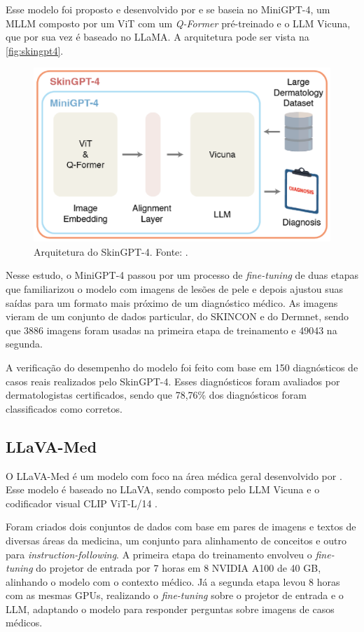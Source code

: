 Esse modelo foi proposto e desenvolvido por \textcite{zhou2023skingpt} e se baseia no Mini\ac{GPT}-4, um \ac{MLLM} composto por um \ac{ViT} com um \textit{Q-Former}
pré-treinado e o \ac{LLM} Vicuna, que por sua vez é baseado no \ac{LLaMA}. A arquitetura pode ser vista na \autoref{fig:skingpt4}.

\begin{figure}[ht]
    \centering
    \includegraphics[width=0.55\columnwidth,keepaspectratio]{images/skingpt4.png}
    \caption{\small Arquitetura do Skin\ac{GPT}-4. Fonte: \textcite{zhou2023skingpt}.}
    \label{fig:skingpt4}
\end{figure}

Nesse estudo, o Mini\ac{GPT}-4 passou por um processo de \textit{fine-tuning} de duas etapas que familiarizou o modelo com imagens de lesões de pele e depois ajustou suas
saídas para um formato mais próximo de um diagnóstico médico. As imagens vieram de um conjunto de dados particular, do SKINCON e do Dermnet, sendo que 3886 imagens foram
usadas na primeira etapa de treinamento e 49043 na segunda.

A verificação do desempenho do modelo foi feito com base em 150 diagnósticos de casos reais realizados pelo Skin\ac{GPT}-4. Esses diagnósticos foram avaliados por
dermatologistas certificados, sendo que 78,76\% dos diagnósticos foram classificados como corretos.

\subsection{LLaVA-Med}

O \ac{LLaVA}-Med é um modelo com foco na área médica geral desenvolvido por \textcite{li2024llava}. Esse modelo é baseado no \ac{LLaVA}, sendo composto pelo \ac{LLM}
Vicuna e o codificador visual \ac{CLIP} \ac{ViT}-L/14 \cite{liu2024visual}.

Foram criados dois conjuntos de dados com base em pares de imagens e textos de diversas áreas da medicina, um conjunto para alinhamento de conceitos e outro para
\textit{instruction-following}. A primeira etapa do treinamento envolveu o \textit{fine-tuning} do projetor de entrada por 7 horas em 8 NVIDIA A100 de 40 GB, alinhando
o modelo com o contexto médico. Já a segunda etapa levou 8 horas com as mesmas GPUs, realizando o \textit{fine-tuning} sobre o projetor de entrada e o \ac{LLM}, adaptando
o modelo para responder perguntas sobre imagens de casos médicos.


